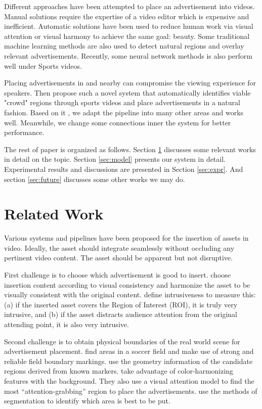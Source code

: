 \documentclass{sig-alternate}
\begin{document}
Different approaches have been attempted to place an advertisement into videos.
Manual solutions require the expertise of a video editor which is expensive and inefficient.
Automatic solutions have been used to reduce human work via visual attention \cite{} or visual harmony \cite{} to achieve the same goal: beauty.
Some traditional machine learning methods \cite{5,25} are also used to detect natural regions and overlay relevant advertisements.
Recently, some neural network methods \cite{} is also perform well under Sports videos.

Placing advertisements in and nearby can compromise the viewing experience for speakers. Then \cite{} propose such a novel system that automatically identifies viable "crowd" regions through sports videos and place advertisements in a natural fashion. 
Based on it \cite{}, we adapt the pipeline into many other areas and works well. Meanwhile, we change some connections inner the system for better performance.

The rest of paper is organized as follows. Section \ref{sec:rel-work} discusses some relevant works in detail on the topic. Section \ref{sec:model} presents our system in detail. Experimental results and discussions are presented in Section \ref{sec:expr}. And section \ref{sec:future} discusses some other works we may do.

\section{Related Work}
\label{sec:rel-work}

Various systems and pipelines have been proposed for the insertion of assets in video. Ideally, the asset should integrate seamlessly without occluding any pertinent video content. The asset should be apparent but not disruptive.

First challenge is to choose which advertisement is good to insert. 
\cite{26} choose insertion content according to visual consistency and \cite{6} harmonize the asset to be visually consistent with the original content. 
\cite{21} define intrusiveness to measure this: (a) if the inserted asset covers the Region of Interest (ROI), it is truly very intrusive, and (b) if the asset distracts audience attention from the original attending point, it is also very intrusive.

Second challenge is to obtain physical boundaries of the real world scene for advertisement placement. 
\cite{30} find areas in a soccer field and make use of strong and reliable field boundary markings.
\cite{29} use the geometry information of the candidate regions derived from known markers.
\cite{5} take advantage of color-harmonizing features with the background. They also use a visual attention model to find the most
“attention-grabbing” region to place the advertisements.
\cite{paper} use the methods of segmentation to identify which area is best to be put.
\end{document}
